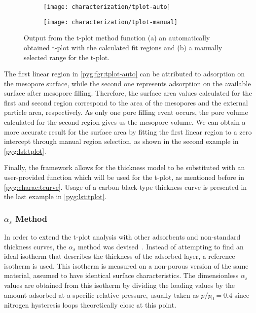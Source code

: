 \begin{figure}[!htb]
	\centering

	\begin{subfigure}{0.45\linewidth}
		\parbox[c]{0.1\linewidth}{\caption{}%
			\label{pyg:fgr:tplot-auto}}
		\parbox[b]{0.85\linewidth}{%
			\texttt{[image: characterization/tplot-auto]}}
	\end{subfigure}
	\begin{subfigure}{0.45\linewidth}
		\parbox[c]{0.1\linewidth}{\caption{}%
			\label{pyg:fgr:tplot-manual}}
		\parbox[b]{0.85\linewidth}{%
			\texttt{[image: characterization/tplot-manual]}}
	\end{subfigure}

	\caption{Output from the t-plot method function (a) an automatically
		obtained t-plot with the calculated fit regions and (b) a manually
		selected range for the t-plot.}%
	\label{pyg:fgr:tplot}

\end{figure}

The first linear region in \autoref{pyg:fgr:tplot-auto} can be attributed
to adsorption on the mesopore surface,
while the second one represents adsorption on the available surface
after mesopore filling. Therefore, the surface area values calculated 
for the first and second region correspond to the area of the mesopores
and the external particle area, respectively. As only one pore filling 
event occurs, the pore volume calculated for the second region gives
us the mesopore volume. We can obtain a more accurate result for the
surface area by fitting the first linear region to a zero intercept
through manual region selection, as shown in the second example in 
\autoref{pyg:lst:tplot}.

Finally, the framework allows for the thickness model to be substituted
with an user-provided function which will be used for the t-plot, 
as mentioned before in \autoref{pyg:charac:tcurve}.
Usage of a carbon black-type thickness curve is presented in the last
example in \autoref{pyg:lst:tplot}.

\subsubsection{\(\alpha_s\) Method}\label{pyg:charac:alphasplot}

In order to extend the t-plot analysis with other adsorbents and 
non-standard thickness curves, the \(\alpha_s\) method was
devised~\cite{atkinsonAdsorptivePropertiesMicroporous1984}.
Instead of attempting to find an ideal isotherm that describes the
thickness of the adsorbed layer, a reference isotherm is used.
This isotherm is measured on a non-porous version of the same material,
assumed to have identical surface characteristics.
The dimensionless \(\alpha_s\) values are obtained from this isotherm by
dividing the loading values by the amount adsorbed at a specific relative
pressure, usually taken as \(p/p_0=0.4\) since nitrogen hysteresis loops
theoretically close at this point.


